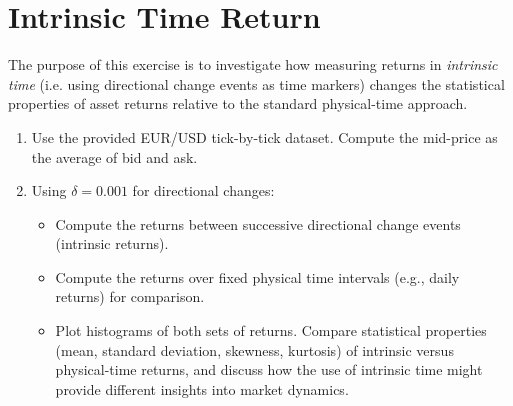\section{Intrinsic Time Return}
The purpose of this exercise is to investigate how measuring returns in \emph{intrinsic time} (i.e. using directional change events as time markers) changes the statistical properties of asset returns relative to the standard physical-time approach.
\begin{enumerate}
    \item Use the provided EUR/USD tick-by-tick dataset. Compute the mid-price as the average of bid and ask. 
    \item Using $\delta=0.001$ for directional changes:
    \begin{itemize}
        \item Compute the returns between successive directional change events (intrinsic returns).
        \item Compute the returns over fixed physical time intervals (e.g., daily returns) for comparison.    
        \item Plot histograms of both sets of returns. Compare statistical properties (mean, standard deviation, skewness, kurtosis) of intrinsic versus physical-time returns, and discuss how the use of intrinsic time might provide different insights into market dynamics.
    \end{itemize}
\end{enumerate}